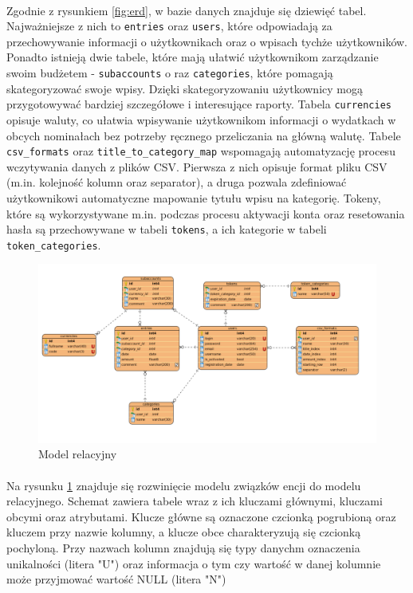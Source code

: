\documentclass{article}
\begin{document}
	\paragraph{} Zgodnie z rysunkiem \ref{fig:erd}, w bazie danych znajduje się dziewięć tabel. Najważniejsze z nich to \texttt{entries} oraz \texttt{users}, które odpowiadają za przechowywanie informacji o użytkownikach oraz o wpisach tychże użytkowników. Ponadto istnieją dwie tabele, które mają ułatwić użytkownikom zarządzanie swoim budżetem - \texttt{subaccounts} o raz \texttt{categories}, które pomagają skategoryzować swoje wpisy. Dzięki skategoryzowaniu użytkownicy mogą przygotowywać bardziej szczegółowe i interesujące raporty. Tabela \texttt{currencies} opisuje waluty, co ułatwia wpisywanie użytkownikom informacji o wydatkach w obcych nominałach bez potrzeby ręcznego przeliczania na główną walutę. Tabele \texttt{csv\_formats} oraz \texttt{title\_to\_category\_map} wspomagają automatyzację procesu wczytywania danych z plików CSV. Pierwsza z nich opisuje format pliku CSV (m.in. kolejność kolumn oraz separator), a druga pozwala zdefiniować użytkownikowi automatyczne mapowanie tytułu wpisu na kategorię. Tokeny, które są wykorzystywane m.in. podczas procesu aktywacji konta oraz resetowania hasła są przechowywane w tabeli \texttt{tokens}, a ich kategorie w tabeli \texttt{token\_categories}.

	\begin{figure}[H]
		\centering
		\includegraphics[width=1\linewidth]{assets/bd1.png}
		\caption[]{Model relacyjny}
		\label{fig:rel}
	\end{figure}

	\paragraph{} Na rysunku \ref{fig:rel} znajduje się rozwinięcie modelu związków encji do modelu relacyjnego. Schemat zawiera tabele wraz z ich kluczami głównymi, kluczami obcymi oraz atrybutami. Klucze główne są oznaczone czcionką pogrubioną oraz kluczem przy nazwie kolumny, a klucze obce charakteryzują się czcionką pochyloną. Przy nazwach kolumn znajdują się typy danychm oznaczenia unikalności (litera "U") oraz informacja o tym czy wartość w danej kolumnie może przyjmować wartość NULL (litera "N")
\end{document}
